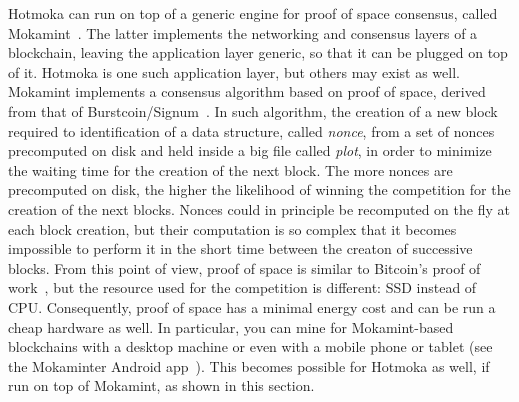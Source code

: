 Hotmoka can run on top of a generic engine for proof of space consensus, called Mokamint~\cite{mokamint_github}.
The latter implements the networking and consensus layers of a blockchain, leaving the application
layer generic, so that it can be plugged on top of it. Hotmoka is one such application layer,
but others may exist as well. Mokamint implements a consensus algorithm based on proof of space,
derived from that of Burstcoin/Signum~\cite{Spoto25}. In such algorithm, the creation of a new
block required to identification of a data structure, called \emph{nonce}, from a set of
nonces precomputed on disk and held inside a big file called \emph{plot},
in order to minimize the waiting time for the creation of the next block.
The more nonces are precomputed on disk, the higher the likelihood of winning the competition for
the creation of the next blocks. Nonces could in principle be recomputed on the fly at each
block creation, but their computation is so complex that it becomes impossible to perform it
in the short time between the creaton of successive blocks. From this point of view, proof of space
is similar to Bitcoin's proof of work~\cite{Nakamoto08}, but the resource used for the competition
is different: SSD instead of CPU. Consequently, proof of space has a minimal energy cost and can be
run a cheap hardware as well. In particular, you can mine for Mokamint-based blockchains with a desktop machine
or even with a mobile phone or tablet (see the Mokaminter Android app~\cite{mokaminter_google_play}).
This becomes possible for Hotmoka as well, if run on top of Mokamint, as shown in this section.

